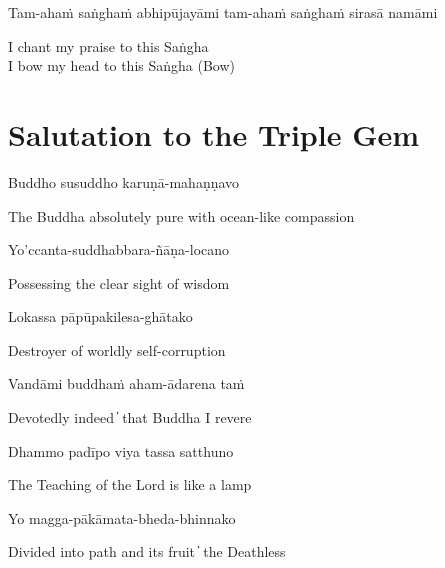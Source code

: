 Tam-ahaṁ saṅghaṁ abhipūjayāmi tam-ahaṁ saṅghaṁ sirasā namāmi

\begin{cprenglish}
  I chant my praise to this Saṅgha\\
  I bow my head to this Saṅgha (Bow)
\end{cprenglish}

\section{Salutation to the Triple Gem}

\begin{leader}
\end{leader}
\begin{leader}
\end{leader}


Buddho susuddho karuṇā-mahaṇṇavo

\begin{cprenglish}
  The Buddha absolutely pure with ocean-like compassion
\end{cprenglish}

Yo'ccanta-suddhabbara-ñāṇa-locano

\begin{cprenglish}
  Possessing the clear sight of wisdom
\end{cprenglish}

Lokassa pāpūpakilesa-ghātako

\begin{cprenglish}
  Destroyer of worldly self-corruption
\end{cprenglish}

Vandāmi buddhaṁ aham-ādarena taṁ

\begin{cprenglish}
  Devotedly indeed  ̓  that Buddha I revere
\end{cprenglish}

Dhammo padīpo viya tassa satthuno

\begin{cprenglish}
  The Teaching of the Lord is like a lamp
\end{cprenglish}

Yo magga-pākāmata-bheda-bhinnako

\begin{cprenglish}
  Divided into path and its fruit  ̓  the Deathless
\end{cprenglish}

